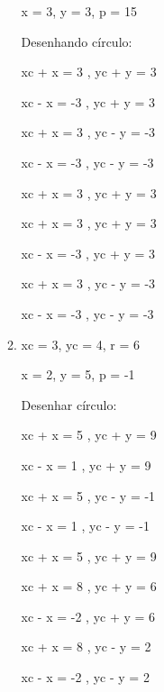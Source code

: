 \begin{enumerate}
\begin{enumerate}[label=\alph*]
            x = 3, y = 3, p = 15

               Desenhando círculo:
               
                  xc + x = 3 , yc + y = 3
                  
                  xc - x = -3 , yc + y = 3
                  
                  xc + x = 3 , yc - y = -3
                  
                  xc - x = -3 , yc - y = -3
                  
                  xc + x = 3 , yc + y = 3
                  
                  xc + x = 3 , yc + y = 3
                  
                  xc - x = -3 , yc + y = 3
                  
                  xc + x = 3 , yc - y = -3
                  
                  xc - x = -3 , yc - y = -3

            \item 
             xc = 3, yc = 4, r = 6
             
             x = 2, y = 5, p = -1
             
             Desenhar círculo:
             
					xc + x = 5 , yc + y = 9
					
					xc - x = 1 , yc + y = 9
					
					xc + x = 5 , yc - y = -1
					
					xc - x = 1 , yc - y = -1
					
					xc + x = 5 , yc + y = 9
					
					xc + x = 8 , yc + y = 6
					
					xc - x = -2 , yc + y = 6
					
					xc + x = 8 , yc - y = 2
					
					xc - x = -2 , yc - y = 2
                
		\end{enumerate}
		
	\end{enumerate}
